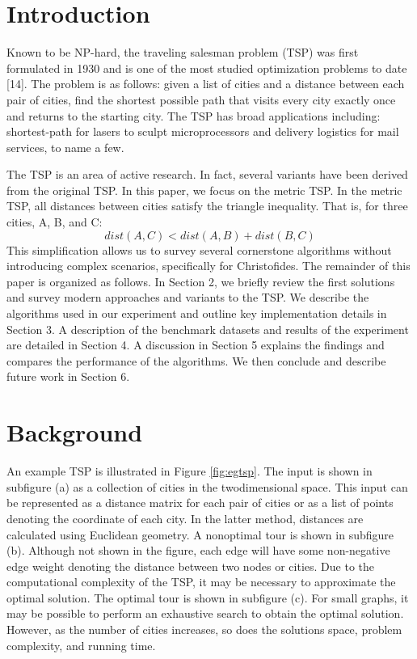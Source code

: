 \documentclass[10pt,twocolumn,letterpaper]{article}
\begin{document}
\section{Introduction}
Known to be NP-hard, the traveling salesman problem (TSP) was first formulated in 1930 and is one of the most studied optimization problems to date [14]. The problem is as follows: given a list of cities and a distance between each pair of cities, find the shortest possible path that visits every city exactly once and returns to the starting city. The TSP has broad applications including: shortest-path
for lasers to sculpt microprocessors and delivery logistics for mail services, to name a few.

The TSP is an area of active research. In fact, several
variants have been derived from the original TSP. In this
paper, we focus on the metric TSP. In the metric TSP, all
distances between cities satisfy the triangle inequality. That
is, for three cities, A, B, and C:
\begin{equation}
	dist(A, C) < dist(A, B) + dist(B, C)
\end{equation}
This simplification allows us to survey several cornerstone algorithms without introducing complex scenarios, specifically
for Christofides. The remainder of this paper is organized
as follows. In Section 2, we briefly review the first solutions
and survey modern approaches and variants to the TSP. We
describe the algorithms used in our experiment and outline
key implementation details in Section 3. A description of
the benchmark datasets and results of the experiment are
detailed in Section 4. A discussion in Section 5 explains the
findings and compares the performance of the algorithms.
We then conclude and describe future work in Section 6.

\section{Background}
An example TSP is illustrated in Figure \ref{fig:egtsp}. The input is
shown in subfigure (a) as a collection of cities in the twodimensional space. This input can be represented as a distance matrix for each pair of cities or as a list of points
denoting the coordinate of each city. In the latter method,
distances are calculated using Euclidean geometry. A nonoptimal tour is shown in subfigure (b). Although not shown
in the figure, each edge will have some non-negative edge
weight denoting the distance between two nodes or cities.
Due to the computational complexity of the TSP, it may be
necessary to approximate the optimal solution. The optimal
tour is shown in subfigure (c). For small graphs, it may be
possible to perform an exhaustive search to obtain the optimal solution. However, as the number of cities increases, so
does the solutions space, problem complexity, and running
time.
\end{document}
